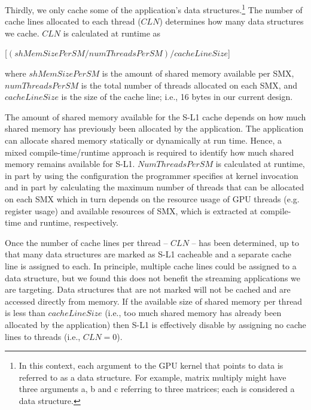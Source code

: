 
Thirdly, we only cache some of the application's data structures.\footnote{
    In this context, each argument to the GPU kernel that points to data is referred to as a data structure. 
    For example, matrix multiply might have three arguments a, b and c referring to three matrices;
    each is considered a data structure.}
The number of cache lines allocated to each thread ($CLN$) determines how many data structures we cache.
$CLN$ is calculated at runtime as
\begin{center} 
[$(shMemSizePerSM / numThreadsPerSM) / cacheLineSize$]
\end{center}
where $shMemSizePerSM$ is the amount of shared memory available per SMX, $numThreadsPerSM$ is the
total number of threads allocated on each SMX, and $cacheLineSize$ is the size of the cache line;
i.e., 16 bytes in our current design. 

The amount of shared memory available for the S-L1 cache depends on how much shared memory has previously been allocated by the application.
The application can allocate shared memory statically or dynamically at run time.
Hence, a mixed compile-time/runtime approach is required to identify how much shared memory remains available for S-L1.
$NumThreadsPerSM$ is calculated at runtime, in part by using the configuration
the programmer specifies at kernel invocation
and in part by calculating the maximum number of threads that can be allocated on each SMX which in
turn depends on the resource usage of GPU threads (e.g. register usage) and available
resources of SMX, which is extracted at compile-time and runtime, respectively.

Once the number of cache lines per thread -- $CLN$ -- has been determined, up to that many data structures are marked as S-L1 cacheable and a separate cache line is assigned to each.
In principle, multiple cache lines could be assigned to a data structure, but we found this does not benefit the streaming applications we are targeting.
Data structures that are not marked will not be cached and are accessed directly from memory. 
If the available size of shared memory per thread is less than $cacheLineSize$ (i.e., too much shared memory has already been allocated by the application) then S-L1 is effectively disable by assigning no cache lines to threads (i.e., $CLN = 0$). 

